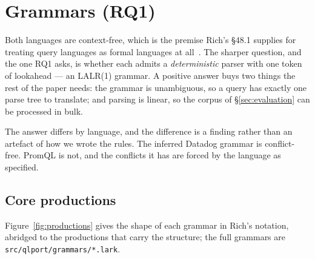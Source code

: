 \section{Grammars (RQ1)}
\label{sec:grammars}

Both languages are context-free, which is the premise Rich's §48.1 supplies for treating
query languages as formal languages at all~\citep{rich2008}. The sharper question, and
the one RQ1 asks, is whether each admits a \emph{deterministic} parser with one token of
lookahead --- an LALR(1) grammar. A positive answer buys two things the rest of the paper
needs: the grammar is unambiguous, so a query has exactly one parse tree to translate;
and parsing is linear, so the corpus of \S\ref{sec:evaluation} can be processed in bulk.

The answer differs by language, and the difference is a finding rather than an artefact
of how we wrote the rules. The inferred Datadog grammar is conflict-free. PromQL is not,
and the conflicts it has are forced by the language as specified.

\subsection{Core productions}

Figure~\ref{fig:productions} gives the shape of each grammar in Rich's notation,
abridged to the productions that carry the structure; the full grammars are
\texttt{src/qlport/grammars/*.lark}.

